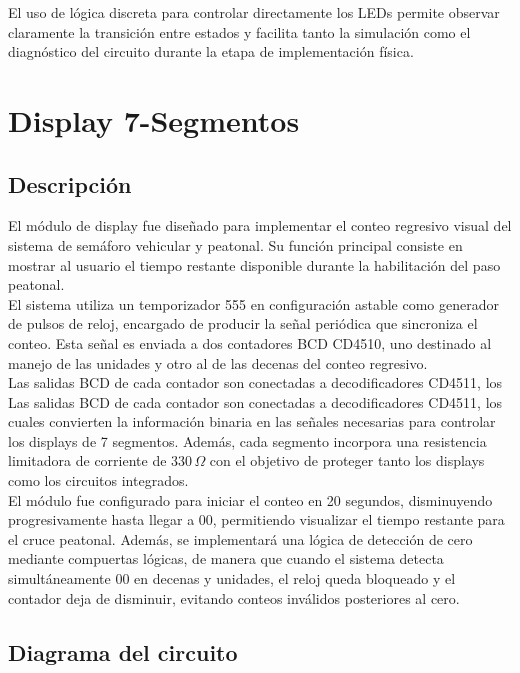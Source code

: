 \documentclass[12pt, journal, onecolumn]{IEEEtran}
\begin{document}
El uso de lógica discreta para controlar directamente los LEDs permite observar claramente la transición entre estados y facilita tanto la simulación como el diagnóstico del circuito durante la etapa de implementación física.

\newpage

\section{\textbf{Display 7-Segmentos}}
\subsection{Descripción}
El módulo de display fue diseñado para implementar el conteo regresivo visual del sistema de semáforo vehicular y peatonal. Su función principal consiste en mostrar al usuario el tiempo restante disponible durante la habilitación del paso peatonal.\\

El sistema utiliza un temporizador 555 en configuración astable como generador de pulsos de reloj, encargado de producir la señal periódica que sincroniza el conteo. Esta señal es enviada a dos contadores BCD CD4510, uno destinado al manejo de las unidades y otro al de las decenas del conteo regresivo.\\

Las salidas BCD de cada contador son conectadas a decodificadores CD4511, los Las salidas BCD de cada contador son conectadas a decodificadores CD4511, los cuales convierten la información binaria en las señales necesarias para controlar los displays de 7 segmentos. Además, cada segmento incorpora una resistencia limitadora de corriente de 330\,$\Omega$ con el objetivo de proteger tanto los displays como los circuitos integrados.\\

El módulo fue configurado para iniciar el conteo en 20 segundos, disminuyendo progresivamente hasta llegar a 00, permitiendo visualizar el tiempo restante para el cruce peatonal. Además, se implementará una lógica de detección de cero mediante compuertas lógicas, de manera que cuando el sistema detecta simultáneamente 00 en decenas y unidades, el reloj queda bloqueado y el contador deja de disminuir, evitando conteos inválidos posteriores al cero.


\subsection{Diagrama del circuito}
	
\end{document}
